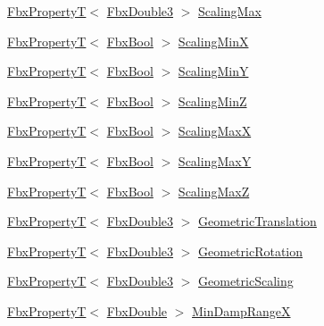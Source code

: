 \begin{Indent}
\begin{DoxyCompactItemize}
\item 
\hyperlink{class_fbx_property_t}{Fbx\+PropertyT}$<$ \hyperlink{fbxtypes_8h_ae0a96f14cde566774c7553aa7523b7a7}{Fbx\+Double3} $>$ \hyperlink{class_fbx_node_a530a22a286aa932f665abfa1bbda2ea8}{Scaling\+Max}
\item 
\hyperlink{class_fbx_property_t}{Fbx\+PropertyT}$<$ \hyperlink{fbxtypes_8h_a92e0562b2fe33e76a242f498b362262e}{Fbx\+Bool} $>$ \hyperlink{class_fbx_node_ad47427b4a9e01ab8e08a0a589a0f1c43}{Scaling\+MinX}
\item 
\hyperlink{class_fbx_property_t}{Fbx\+PropertyT}$<$ \hyperlink{fbxtypes_8h_a92e0562b2fe33e76a242f498b362262e}{Fbx\+Bool} $>$ \hyperlink{class_fbx_node_ac152b4cc6a615ef0e98b802807f060da}{Scaling\+MinY}
\item 
\hyperlink{class_fbx_property_t}{Fbx\+PropertyT}$<$ \hyperlink{fbxtypes_8h_a92e0562b2fe33e76a242f498b362262e}{Fbx\+Bool} $>$ \hyperlink{class_fbx_node_aba3dd61a9e6d3d553fe0a16e1027ba2b}{Scaling\+MinZ}
\item 
\hyperlink{class_fbx_property_t}{Fbx\+PropertyT}$<$ \hyperlink{fbxtypes_8h_a92e0562b2fe33e76a242f498b362262e}{Fbx\+Bool} $>$ \hyperlink{class_fbx_node_a2c2926361960045a1719befae430bac0}{Scaling\+MaxX}
\item 
\hyperlink{class_fbx_property_t}{Fbx\+PropertyT}$<$ \hyperlink{fbxtypes_8h_a92e0562b2fe33e76a242f498b362262e}{Fbx\+Bool} $>$ \hyperlink{class_fbx_node_a6a515f87577f63a57a7fe8a6c971d9ad}{Scaling\+MaxY}
\item 
\hyperlink{class_fbx_property_t}{Fbx\+PropertyT}$<$ \hyperlink{fbxtypes_8h_a92e0562b2fe33e76a242f498b362262e}{Fbx\+Bool} $>$ \hyperlink{class_fbx_node_af4c72a83f64207cbcad432a5f48432af}{Scaling\+MaxZ}
\item 
\hyperlink{class_fbx_property_t}{Fbx\+PropertyT}$<$ \hyperlink{fbxtypes_8h_ae0a96f14cde566774c7553aa7523b7a7}{Fbx\+Double3} $>$ \hyperlink{class_fbx_node_a34e3c56f86ea2484d512bfbaf2958bb6}{Geometric\+Translation}
\item 
\hyperlink{class_fbx_property_t}{Fbx\+PropertyT}$<$ \hyperlink{fbxtypes_8h_ae0a96f14cde566774c7553aa7523b7a7}{Fbx\+Double3} $>$ \hyperlink{class_fbx_node_aa4c18688d7b0590c405af9198e27a678}{Geometric\+Rotation}
\item 
\hyperlink{class_fbx_property_t}{Fbx\+PropertyT}$<$ \hyperlink{fbxtypes_8h_ae0a96f14cde566774c7553aa7523b7a7}{Fbx\+Double3} $>$ \hyperlink{class_fbx_node_abc071af68acc0b2fa5fd98ce8d40471f}{Geometric\+Scaling}
\item 
\hyperlink{class_fbx_property_t}{Fbx\+PropertyT}$<$ \hyperlink{fbxtypes_8h_a171e72a1c46fc15c1a6c9c31948c1c5b}{Fbx\+Double} $>$ \hyperlink{class_fbx_node_a909da57f9cf8bb6e9e15c1d95b7919b6}{Min\+Damp\+RangeX}

\end{DoxyCompactItemize}
\end{Indent}
